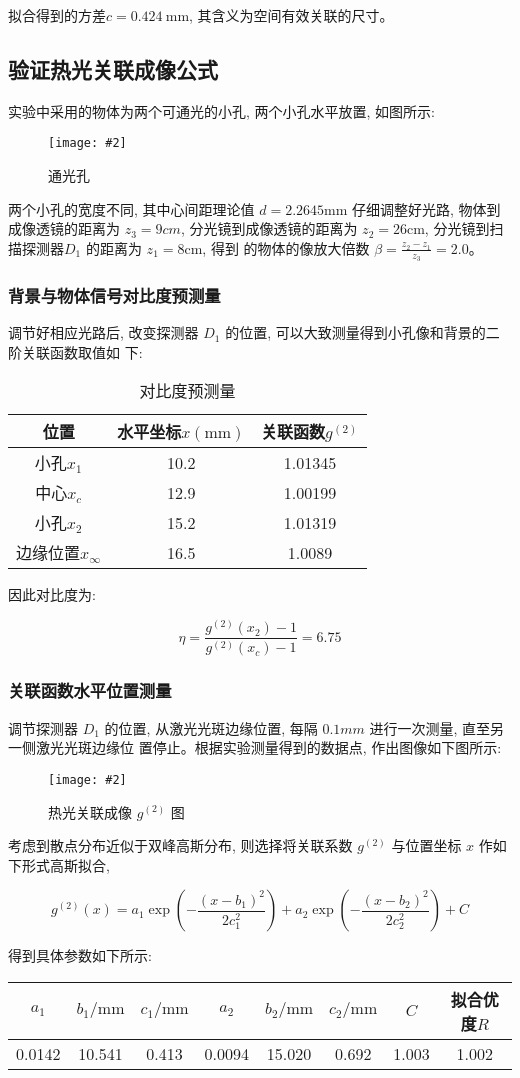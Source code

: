 \documentclass[12pt,a4paper]{article}
\newcommand{\be}[1]{
    \begin{equation}
        #1
    \end{equation}
}
\newcommand{\bfig}[3]{
    \begin{figure}[H]
        \centering
        \texttt{[image: \#2]}
        \caption{#3}
    \end{figure}
}
\begin{document}
拟合得到的方差$c=0.424 \mathrm{~mm}$, 其含义为空间有效关联的尺寸。
\subsection{验证热光关联成像公式}
实验中采用的物体为两个可通光的小孔, 两个小孔水平放置, 如图所示:
\bfig{0.4}{通光孔.jpg}{通光孔}
两个小孔的宽度不同, 其中心间距理论值 $d = 2.2645\mathrm{mm}$ 仔细调整好光路, 物体到成像透镜的距离为
$z_3 = 9cm$, 分光镜到成像透镜的距离为 $z_2 = 26\mathrm{cm}$, 分光镜到扫描探测器$ D_1$ 的距离为 $z_1 = 8\mathrm{cm}$, 得到
的物体的像放大倍数 $\beta =\frac{z_2 − z_1}{z_3}= 2.0$。

\subsubsection{背景与物体信号对比度预测量}


调节好相应光路后, 改变探测器 $D_1$ 的位置, 可以大致测量得到小孔像和背景的二阶关联函数取值如
下:
\begin{table}[H]
    \centering
    \begin{tabular}{|c|c|c|}
    \hline
    位置     & 水平坐标$x(\mathrm{mm})$ & 关联函数$g^{(2)}$  \\ \hline
    小孔$x_1$   & 10.2  & 1.01345 \\ \hline
    中心$x_c$   & 12.9  & 1.00199 \\ \hline
    小孔$x_2$   & 15.2  & 1.01319 \\ \hline
    边缘位置$x_{\infty}$ & 16.5  & 1.0089 \\ \hline
    \end{tabular}
    \caption{对比度预测量}
    \end{table}


因此对比度为:
\be{\eta=\frac{g^{(2)}\left(x_{2}\right)-1}{g^{(2)}\left(x_{c}\right)-1}=6.75}

\subsubsection{关联函数水平位置测量}
调节探测器 $D_1$ 的位置, 从激光光斑边缘位置, 每隔 $0.1mm$ 进行一次测量, 直至另一侧激光光斑边缘位
置停止。根据实验测量得到的数据点, 作出图像如下图所示:
\bfig{0.8}{空间关联2.png}{ 热光关联成像 $g^{(2)}$ 图}
考虑到散点分布近似于双峰高斯分布, 则选择将关联系数 $g^{(2)}$ 与位置坐标 $x$ 作如下形式高斯拟合,
\be{g^{(2)}(x)=a_{1} \exp \left(-\frac{\left(x-b_{1}\right)^{2}}{2 c_{1}^{2}}\right)+a_{2} \exp \left(-\frac{\left(x-b_{2}\right)^{2}}{2 c_{2}^{2}}\right)+C}
得到具体参数如下所示:
\begin{table}[H]
    \centering
    \begin{tabular}{|c|c|c|c|c|c|c|c|}
    \hline
     $a_1$          & $b_1/\mathrm{mm}$          & $c_1/\mathrm{mm}$          & $a_2$          & $b_2/\mathrm{mm}$         & $c_2/\mathrm{mm}$         &$ C$           & 拟合优度$R$  \\ \hline
    0.0142 & 10.541 & 0.413 & 0.0094 & 15.020 & 0.692 & 1.003 & 1.002 \\ \hline
    \end{tabular}
    \end{table}
\end{document}
